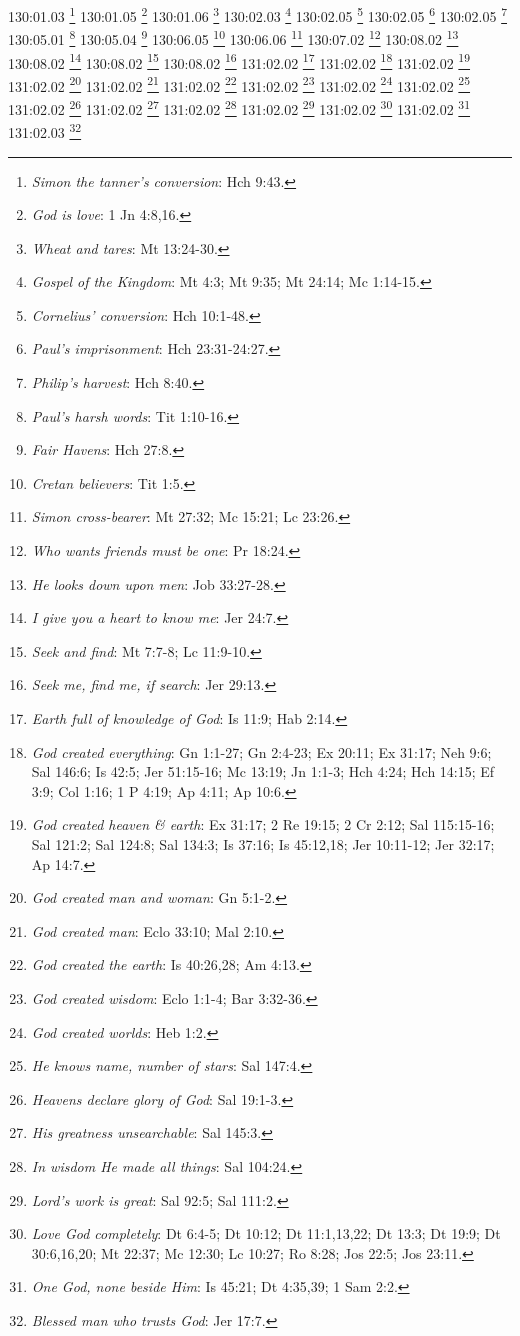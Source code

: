 {{{{{{{{{{{{130:01.03 \footnote{\textit{Simon the tanner's conversion}: Hch 9:43.}
130:01.05 \footnote{\textit{God is love}: 1 Jn 4:8,16.}
130:01.06 \footnote{\textit{Wheat and tares}: Mt 13:24-30.}
130:02.03 \footnote{\textit{Gospel of the Kingdom}: Mt 4:3; Mt 9:35; Mt 24:14; Mc 1:14-15.}
130:02.05 \footnote{\textit{Cornelius' conversion}: Hch 10:1-48.}
130:02.05 \footnote{\textit{Paul's imprisonment}: Hch 23:31-24:27.}
130:02.05 \footnote{\textit{Philip's harvest}: Hch 8:40.}
130:05.01 \footnote{\textit{Paul's harsh words}: Tit 1:10-16.}
130:05.04 \footnote{\textit{Fair Havens}: Hch 27:8.}
130:06.05 \footnote{\textit{Cretan believers}: Tit 1:5.}
130:06.06 \footnote{\textit{Simon cross-bearer}: Mt 27:32; Mc 15:21; Lc 23:26.}
130:07.02 \footnote{\textit{Who wants friends must be one}: Pr 18:24.}
130:08.02 \footnote{\textit{He looks down upon men}: Job 33:27-28.}
130:08.02 \footnote{\textit{I give you a heart to know me}: Jer 24:7.}
130:08.02 \footnote{\textit{Seek and find}: Mt 7:7-8; Lc 11:9-10.}
130:08.02 \footnote{\textit{Seek me, find me, if search}: Jer 29:13.}
131:02.02 \footnote{\textit{Earth full of knowledge of God}: Is 11:9; Hab 2:14.}
131:02.02 \footnote{\textit{God created everything}: Gn 1:1-27; Gn 2:4-23; Ex 20:11; Ex 31:17; Neh 9:6; Sal 146:6; Is 42:5; Jer 51:15-16; Mc 13:19; Jn 1:1-3; Hch 4:24; Hch 14:15; Ef 3:9; Col 1:16; 1 P 4:19; Ap 4:11; Ap 10:6.}
131:02.02 \footnote{\textit{God created heaven & earth}: Ex 31:17; 2 Re 19:15; 2 Cr 2:12; Sal 115:15-16; Sal 121:2; Sal 124:8; Sal 134:3; Is 37:16; Is 45:12,18; Jer 10:11-12; Jer 32:17; Ap 14:7.}
131:02.02 \footnote{\textit{God created man and woman}: Gn 5:1-2.}
131:02.02 \footnote{\textit{God created man}: Eclo 33:10; Mal 2:10.}
131:02.02 \footnote{\textit{God created the earth}: Is 40:26,28; Am 4:13.}
131:02.02 \footnote{\textit{God created wisdom}: Eclo 1:1-4; Bar 3:32-36.}
131:02.02 \footnote{\textit{God created worlds}: Heb 1:2.}
131:02.02 \footnote{\textit{He knows name, number of stars}: Sal 147:4.}
131:02.02 \footnote{\textit{Heavens declare glory of God}: Sal 19:1-3.}
131:02.02 \footnote{\textit{His greatness unsearchable}: Sal 145:3.}
131:02.02 \footnote{\textit{In wisdom He made all things}: Sal 104:24.}
131:02.02 \footnote{\textit{Lord's work is great}: Sal 92:5; Sal 111:2.}
131:02.02 \footnote{\textit{Love God completely}: Dt 6:4-5; Dt 10:12; Dt 11:1,13,22; Dt 13:3; Dt 19:9; Dt 30:6,16,20; Mt 22:37; Mc 12:30; Lc 10:27; Ro 8:28; Jos 22:5; Jos 23:11.}
131:02.02 \footnote{\textit{One God, none beside Him}: Is 45:21; Dt 4:35,39; 1 Sam 2:2.}
131:02.03 \footnote{\textit{Blessed man who trusts God}: Jer 17:7.}
}}}}}}}}}}}}
